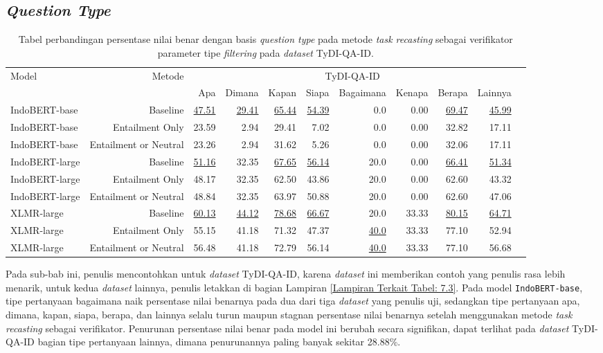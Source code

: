 \subsection{\emph{Question Type}}
\begin{table}[H]\centering
\scriptsize
\begin{tabular}{lrrrrrrrrrr}\toprule
\multirow{2}{*}{Model} &\multirow{2}{*}{Metode} &\multicolumn{8}{c}{TyDI-QA-ID} \\\cmidrule{3-10}
& &Apa &Dimana &Kapan &Siapa &Bagaimana &Kenapa &Berapa &Lainnya \\\midrule
IndoBERT-base &Baseline &\underline{47.51} &\underline{29.41} &\underline{65.44} &\underline{54.39} &0.0 &0.00 &\underline{69.47} &\underline{45.99} \\
IndoBERT-base &Entailment Only &23.59 &2.94 &29.41 &7.02 &0.0 &0.00 &32.82 &17.11 \\
IndoBERT-base &Entailment or Neutral &23.26 &2.94 &31.62 &5.26 &0.0 &0.00 &32.06 &17.11 \\
\hline
IndoBERT-large &Baseline &\underline{51.16} &32.35 &\underline{67.65} &\underline{56.14} &20.0 &0.00 &\underline{66.41} &\underline{51.34} \\
IndoBERT-large &Entailment Only &48.17 &32.35 &62.50 &43.86 &20.0 &0.00 &62.60 &43.32 \\
IndoBERT-large &Entailment or Neutral &48.84 &32.35 &63.97 &50.88 &20.0 &0.00 &62.60 &47.06 \\
\hline
XLMR-large &Baseline &\underline{60.13} &\underline{44.12} &\underline{78.68} &\underline{66.67} &20.0 &33.33 &\underline{80.15} &\underline{64.71} \\
XLMR-large &Entailment Only &55.15 &41.18 &71.32 &47.37 &\underline{40.0} &33.33 &77.10 &52.94 \\
XLMR-large &Entailment or Neutral &56.48 &41.18 &72.79 &56.14 &\underline{40.0} &33.33 &77.10 &56.68 \\
\bottomrule
\end{tabular}
\caption{Tabel perbandingan persentase nilai benar dengan basis \emph{question type} pada metode \emph{task recasting} sebagai verifikator parameter tipe \emph{filtering} pada \emph{dataset} TyDI-QA-ID.}
\end{table}

Pada sub-bab ini, penulis mencontohkan untuk \emph{dataset} TyDI-QA-ID, karena \emph{dataset} ini memberikan contoh yang penulis rasa lebih menarik, untuk kedua \emph{dataset} lainnya, penulis letakkan di bagian Lampiran \ref{Lampiran Terkait Tabel: 7.3}. Pada model \texttt{IndoBERT-base}, tipe pertanyaan bagaimana naik persentase nilai benarnya pada dua dari tiga \emph{dataset} yang penulis uji, sedangkan tipe pertanyaan apa, dimana, kapan, siapa, berapa, dan lainnya selalu turun maupun stagnan persentase nilai benarnya setelah menggunakan metode \emph{task recasting} sebagai verifikator. Penurunan persentase nilai benar pada model ini berubah secara signifikan, dapat terlihat pada \emph{dataset} TyDI-QA-ID bagian tipe pertanyaan lainnya, dimana penurunannya paling banyak sekitar 28.88\%.

